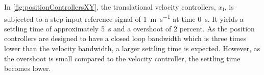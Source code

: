 \begin{minipage}{\linewidth}
\begin{minipage}{0.5\linewidth}
\begin{figure}[H]
            \centering
            \label{fig:velocityControllersXYAction}
        \end{figure}
    \end{minipage}
\end{minipage}

In \autoref{fig:positionControllersXY}, the translational velocity controllers, $x_{\mathrm{I}}$, is subjected to a step input reference signal of \SI{1}{m s^{-1}} at time \SI{0}{s}. It yields a settling time of approximately \SI{5}{s} and a overshoot of 2 percent. As the position controllers are designed to have a closed loop bandwidth which is three times lower than the velocity bandwidth, a larger settling time is expected. However, as the overshoot is small compared to the velocity controller, the settling time becomes lower.%


